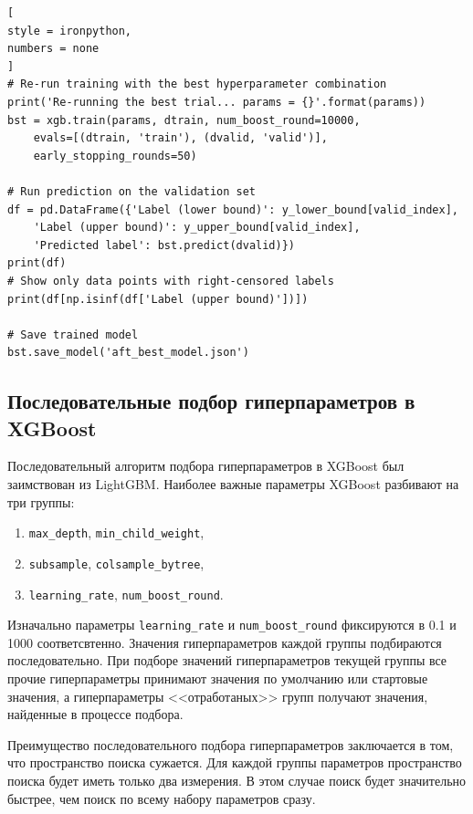\documentclass[%
	11pt,
	a4paper,
	utf8,
		]{article}
\begin{document}
\begin{lstlisting}[
style = ironpython,
numbers = none
]
# Re-run training with the best hyperparameter combination
print('Re-running the best trial... params = {}'.format(params))
bst = xgb.train(params, dtrain, num_boost_round=10000,
	evals=[(dtrain, 'train'), (dvalid, 'valid')],
	early_stopping_rounds=50)

# Run prediction on the validation set
df = pd.DataFrame({'Label (lower bound)': y_lower_bound[valid_index],
	'Label (upper bound)': y_upper_bound[valid_index],
	'Predicted label': bst.predict(dvalid)})
print(df)
# Show only data points with right-censored labels
print(df[np.isinf(df['Label (upper bound)'])])

# Save trained model
bst.save_model('aft_best_model.json')
\end{lstlisting}

\subsection{Последовательные подбор гиперпараметров в XGBoost}

Последовательный алгоритм подбора гиперпараметров в XGBoost был заимствован из LightGBM. Наиболее важные параметры XGBoost разбивают на три группы:
\begin{enumerate}
	\item \verb|max_depth|, \verb|min_child_weight|,
	
	\item \verb|subsample|, \verb|colsample_bytree|,
	
	\item \verb|learning_rate|, \verb|num_boost_round|.
\end{enumerate}

Изначально параметры \verb|learning_rate| и \verb|num_boost_round| фиксируются в 0.1 и 1000 соответсвтенно. Значения гиперпараметров каждой группы подбираются последовательно. При подборе значений гиперпараметров текущей группы все прочие гиперпараметры принимают значения по умолчанию или стартовые значения, а гиперпараметры <<отработаных>> групп получают значения, найденные в процессе подбора.

Преимущество последовательного подбора гиперпараметров заключается в том, что пространство поиска сужается. Для каждой группы параметров пространство поиска будет иметь только два измерения. В этом случае поиск будет значительно быстрее, чем поиск по всему набору параметров сразу.
\end{document}
